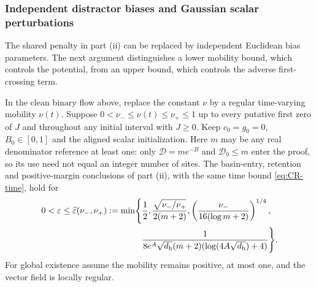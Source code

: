 \subsubsection{Independent distractor biases and Gaussian scalar perturbations}
\label{app:CR-independent}

The shared penalty in part (ii) can be replaced by independent Euclidean bias parameters.
The next argument distinguishes a lower mobility bound, which controls the potential,
from an upper bound, which controls the adverse first-crossing term.

\begin{lemma}
\label{lem:CR-variable}
In the clean binary flow above, replace the constant $\nu$ by a regular time-varying mobility $\nu(t)$.
Suppose $0<\nu_-\le\nu(t)\le\nu_+\le1$ up to every putative first zero of $J$ and throughout any initial interval with $J\ge0$.
Keep $c_0=g_0=0$, $B_0\in[0,1]$ and the aligned scalar initialization.
Here $m$ may be any real denominator reference at least one: only $\mathcal D=me^{-B}$ and $\mathcal D_0\le m$ enter the proof,
so its use need not equal an integer number of sites.
The basin-entry, retention and positive-margin conclusions of part (ii), with the same time bound \cref{eq:CR-time}, hold for
\begin{equation}
 \begin{aligned}
 0<\varepsilon\le\widehat{\varepsilon}(\nu_-,\nu_+):=\min\Biggl\{&\frac12,
 \frac{\sqrt{\nu_-/\nu_+}}{2(m+2)},
 \left(\frac{\nu_-}{16(\log m+2)}\right)^{1/4},\\
 &\frac1{8e^A\sqrt{d_{\mathrm h}}(m+2)(\log(4A\sqrt{d_{\mathrm h}})+4)}\Biggr\}.
 \end{aligned}
 \label{eq:CR-variable-scale}
\end{equation}
For global existence assume the mobility remains positive, at most one, and the vector field is locally regular.
\end{lemma}
